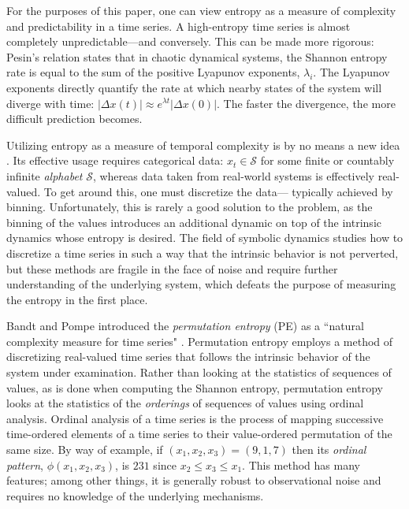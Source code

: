 \documentclass{article}
\begin{document}
For the purposes of this paper, one can view entropy as a measure of complexity
and predictability in a time series.  A high-entropy time series is almost
completely unpredictable---and conversely.  This can be made more rigorous:
Pesin's relation \cite{pesin77} states that in chaotic dynamical systems, the
Shannon entropy rate is equal to the sum of the positive Lyapunov exponents,
$\lambda_i$. The Lyapunov exponents directly quantify the rate at which nearby
states of the system will diverge with time: $\left| \Delta x(t) \right| \approx
e^{\lambda t} \left| \Delta x(0) \right|$.  The faster the divergence, the more
difficult prediction becomes.

Utilizing entropy as a measure of temporal complexity is by no means a new idea
\cite{Shannon1951, mantegna1994linguistic}.  Its effective usage requires
categorical data: $x_t \in \mathcal{S}$ for some finite or countably infinite
\emph{alphabet} $\mathcal{S}$, whereas data taken from real-world systems is
effectively real-valued.  To get around this, one must discretize the data---
typically achieved by binning.  Unfortunately, this is rarely a good solution to
the problem, as the binning of the values introduces an additional dynamic on
top of the intrinsic dynamics whose entropy is desired.  The field of symbolic
dynamics studies how to discretize a time series in such a way that the
intrinsic behavior is not perverted, but these methods are fragile in the face
of noise and require further understanding of the underlying system, which
defeats the purpose of measuring the entropy in the first place.

Bandt and Pompe introduced the \emph{permutation entropy} (PE) as a ``natural
complexity measure for time series" \cite{bandt2002per}.  Permutation entropy
employs a method of discretizing real-valued time series that follows the
intrinsic behavior of the system under examination.  Rather than looking at the
statistics of sequences of values, as is done when computing the Shannon
entropy, permutation entropy looks at the statistics of the \emph{orderings} of
sequences of values using ordinal analysis. Ordinal analysis of a time series is
the process of mapping successive time-ordered elements of a time series to
their value-ordered permutation of the same size.  By way of example, if $(x_1,
x_2, x_3) = (9, 1, 7)$ then its \emph{ordinal pattern}, $\phi(x_1, x_2, x_3)$,
is $231$ since $x_2 \leq x_3 \leq x_1$.  This method has many features; among
other things, it is generally robust to observational noise and requires no
knowledge of the underlying mechanisms.
\end{document}
